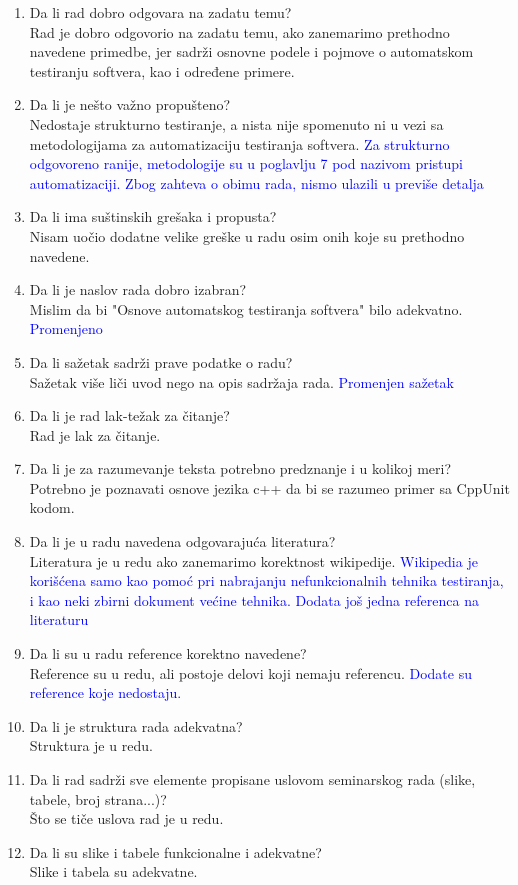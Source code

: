 \documentclass[a4paper]{report}
\newcommand{\odgovor}[1]{\textcolor{blue}{#1}}
\begin{document}
\begin{enumerate}
\item Da li rad dobro odgovara na zadatu temu?\\
Rad je dobro odgovorio na zadatu temu, ako zanemarimo prethodno navedene primedbe, jer sadrži osnovne podele i pojmove o automatskom testiranju softvera, kao i određene primere.

\item Da li je nešto važno propušteno?\\
Nedostaje strukturno testiranje, a nista nije spomenuto ni u vezi sa metodologijama za automatizaciju testiranja softvera.
\odgovor{Za strukturno odgovoreno ranije, metodologije su u poglavlju 7 pod nazivom pristupi automatizaciji. Zbog zahteva o obimu rada, nismo ulazili u previše detalja}
\item Da li ima suštinskih grešaka i propusta?\\
Nisam uočio dodatne velike greške u radu osim onih koje su prethodno navedene.

\item Da li je naslov rada dobro izabran?\\
Mislim da bi "Osnove automatskog testiranja softvera" bilo adekvatno.
\odgovor{Promenjeno}
\item Da li sažetak sadrži prave podatke o radu?\\
Sažetak više liči uvod nego na opis sadržaja rada. 
\odgovor{Promenjen sažetak}
\item Da li je rad lak-težak za čitanje?\\
Rad je lak za čitanje.

\item Da li je za razumevanje teksta potrebno predznanje i u kolikoj meri?\\
Potrebno je poznavati osnove jezika c++ da bi se razumeo primer sa CppUnit kodom.

\item Da li je u radu navedena odgovarajuća literatura?\\
Literatura je u redu ako zanemarimo korektnost wikipedije.
\odgovor{Wikipedia je korišćena samo kao pomoć pri nabrajanju nefunkcionalnih tehnika testiranja, i kao neki zbirni dokument većine tehnika. Dodata još jedna referenca na literaturu}

\item Da li su u radu reference korektno navedene?\\
Reference su u redu, ali postoje delovi koji nemaju referencu.
\odgovor{Dodate su reference koje nedostaju.}
\item Da li je struktura rada adekvatna?\\
Struktura je u redu.

\item Da li rad sadrži sve elemente propisane uslovom seminarskog rada (slike, tabele, broj strana...)?\\
Što se tiče uslova rad je u redu.

\item Da li su slike i tabele funkcionalne i adekvatne?\\
Slike i tabela su adekvatne.

\end{enumerate}
\end{document}
